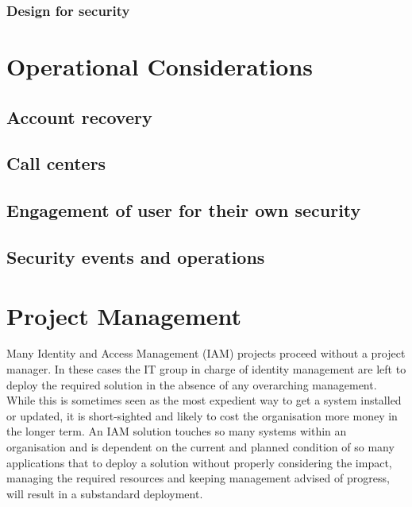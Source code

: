 \hypertarget{design-for-security}{%
\subsection{Design for security}\label{design-for-security}}

\hypertarget{operational-considerations}{%
\chapter{Operational Considerations}\label{operational-considerations}}

\hypertarget{account-recovery}{%
\section{Account recovery}\label{account-recovery}}

\hypertarget{call-centers}{%
\section{Call centers}\label{call-centers}}

\hypertarget{engagement-of-user-for-their-own-security}{%
\section{Engagement of user for their own
security}\label{engagement-of-user-for-their-own-security}}

\hypertarget{security-events-and-operations}{%
\section{Security events and
operations}\label{security-events-and-operations}}

\hypertarget{project-management}{%
\chapter{Project Management}\label{project-management}}

Many Identity and Access Management (IAM) projects proceed without a
project manager. In these cases the IT group in charge of identity
management are left to deploy the required solution in the absence of
any overarching management. While this is sometimes seen as the most
expedient way to get a system installed or updated, it is short-sighted
and likely to cost the organisation more money in the longer term. An
IAM solution touches so many systems within an organisation and is
dependent on the current and planned condition of so many applications
that to deploy a solution without properly considering the impact,
managing the required resources and keeping management advised of
progress, will result in a substandard deployment.

